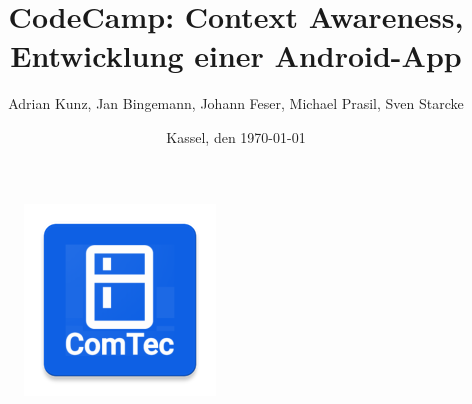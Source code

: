 \documentclass{scrartcl}
\title{CodeCamp: Context Awareness, Entwicklung einer Android-App}
\author{Adrian Kunz, Jan Bingemann, Johann Feser, Michael Prasil, Sven Starcke}
\date{Kassel, den \today}
\begin{document}
	\maketitle
	\vspace*{10ex}
	\begin{figure}[!h]
		\centering
		\includegraphics{figures/title.png}
	\end{figure}

	\newpage

	\tableofcontents
	\newpage

	
	
	
	
\end{document}
